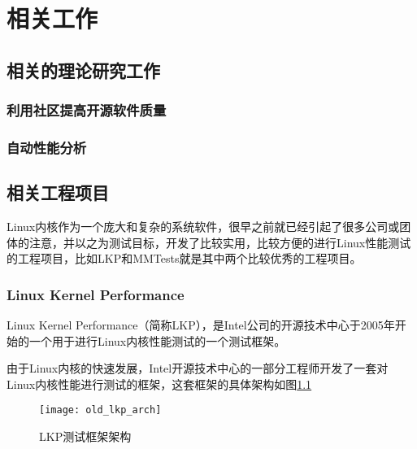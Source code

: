 
\chapter{相关工作}

\section{相关的理论研究工作}

\subsection{利用社区提高开源软件质量}

\subsection{自动性能分析}

\section{相关工程项目}

Linux内核作为一个庞大和复杂的系统软件，很早之前就已经引起了很多公司或团体的注意，并以之为测试目标，开发了比较实用，比较方便的进行Linux性能测试的工程项目，比如LKP\cite{chen2007keeping}和MMTests就是其中两个比较优秀的工程项目。

\subsection{Linux Kernel Performance}

Linux Kernel Performance（简称LKP），是Intel公司的开源技术中心于2005年开始的一个用于进行Linux内核性能测试的一个测试框架。

由于Linux内核的快速发展，Intel开源技术中心的一部分工程师开发了一套对Linux内核性能进行测试的框架，这套框架的具体架构如图\ref{fig:old_lkp_arch}

\begin{figure}[H]
\centering
\texttt{[image: old\_lkp\_arch]}
\caption{LKP测试框架架构}
\label{fig:old_lkp_arch}
\end{figure}

